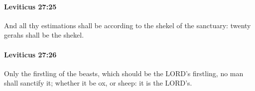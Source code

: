 		\paragraph{Leviticus 27:25} %
			\label{LEVITICUS-27-25}

			And all thy estimations shall be according to the shekel of the sanctuary: twenty gerahs shall be the shekel.


		\paragraph{Leviticus 27:26} %
			\label{LEVITICUS-27-26}

			Only the firstling of the beasts, which should be the LORD’s firstling, no man shall sanctify it; whether it be ox, or sheep: it is the LORD’s.


